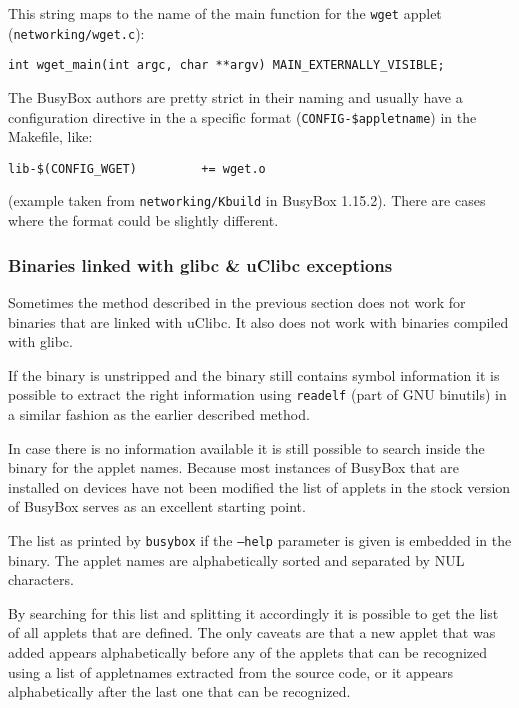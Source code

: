 \documentclass[10pt]{article}
\begin{document}
This string maps to the name of the main function for the \texttt{wget} applet
(\texttt{networking/wget.c}):

\begin{verbatim}
int wget_main(int argc, char **argv) MAIN_EXTERNALLY_VISIBLE;
\end{verbatim}

The BusyBox authors are pretty strict in their naming and usually have a
configuration directive in the a specific format
(\texttt{CONFIG-\$appletname}) in the Makefile, like:

\begin{verbatim}
lib-$(CONFIG_WGET)         += wget.o
\end{verbatim}

(example taken from \texttt{networking/Kbuild} in BusyBox 1.15.2). There are
cases where the format could be slightly different.

\subsubsection{Binaries linked with glibc \& uClibc exceptions}

Sometimes the method described in the previous section does not work for
binaries that are linked with uClibc. It also does not work with binaries
compiled with glibc.

If the binary is unstripped and the binary still contains symbol information
it is possible to extract the right information using \texttt{readelf} (part
of GNU binutils) in a similar fashion as the earlier described method.

In case there is no information available it is still possible to search inside
the binary for the applet names. Because most instances of BusyBox that are
installed on devices have not been modified the list of applets in the stock
version of BusyBox serves as an excellent starting point.

The list as printed by \texttt{busybox} if the \texttt{--help} parameter is
given is embedded in the binary. The applet names are alphabetically sorted
and separated by NUL characters.

By searching for this list and splitting it accordingly it is possible to get
the list of all applets that are defined. The only caveats are that a new
applet that was added appears alphabetically before any of the applets that
can be recognized using a list of appletnames extracted from the source code,
or it appears alphabetically after the last one that can be recognized.
\end{document}
